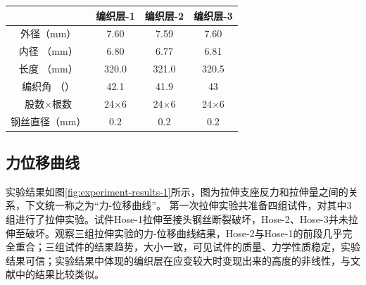\begin{table}[!htb]
	\centering
	\label{tab:hose-specimen}
	\begin{tabular*}{0.8\textwidth}{@{\extracolsep{\fill}}>{\hspace{0.5cm}}cccc}
		\toprule
		                  &     编织层-1     &     编织层-2     &     编织层-3     \\ \midrule
		外径（mm）            &     7.60      &     7.59      &     7.60      \\
		内径 （mm）           &     6.80      &     6.77      &     6.81      \\
		长度 （mm）           &     320.0     &     321.0     &     320.5     \\
		编织角 （\textdegree） &     42.1      &     41.9      &      43       \\
		股数$ \times $根数    & 24$ \times $6 & 24$ \times $6 & 24$ \times $6 \\
		钢丝直径（mm）          &      0.2      &      0.2      &      0.2      \\ \bottomrule
	\end{tabular*} 
\end{table}













\subsection{力位移曲线}
实验结果如图\ref{fig:experiment-results-1}所示，图为拉伸支座反力和拉伸量之间的关系，下文统一称之为“力-位移曲线”。
第一次拉伸实验共准备四组试件，对其中3组进行了拉伸实验。试件Hose-1拉伸至接头钢丝断裂破坏，Hose-2、Hose-3并未拉伸至破坏。观察三组拉伸实验的力-位移曲线结果，Hose-2与Hose-1的前段几乎完全重合；三组试件的结果趋势，大小一致，可见试件的质量、力学性质稳定，实验结果可信；实验结果中体现的编织层在应变较大时变现出来的高度的非线性，与\citeauthor{Hachemi2011}文献中的结果比较类似。

